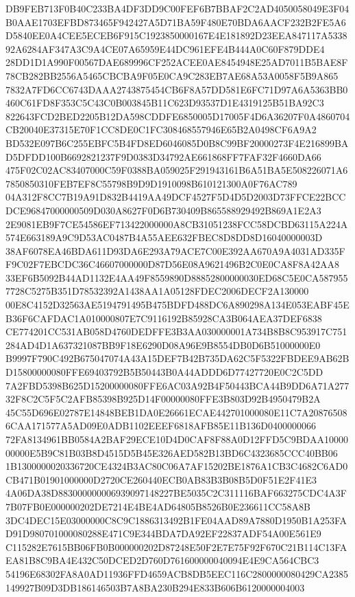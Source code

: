\documentclass[UTF8,fontset=fandol,zihao=-4,a4paper]{ctexart}
\begin{document}
{{DB9FEB713F0B40C233BA4DF3DD9C00FEF6B7BBAF2C2AD4050058049E3F04B0AAE1703EFBD873465F942427A5D71BA59F480E70BDA6AACF232B2FE5A6
D5840EE0A4CEE5ECEB6F915C1923850000167E4E181892D23EEA847117A533892A6284AF347A3C9A4CE07A65959E44DC961EFE4B444A0C60F879DDE4
28DD1D1A990F00567DAE689996CF252ACEE0AE8454948E25AD7011B5BAE8F78CB282BB2556A5465CBCBA9F05E0CA9C283EB7AE68A53A0058F5B9A865
7832A7FD6CC6743DAAA2743875454CB6F8A57DD581E6FC71D97A6A5363BB0460C61FD8F353C5C43C0B003845B11C623D93537D1E4319125B51BA92C3
822643FCD2BED2205B12DA598CDDFE6850005D17005F4D6A36207F0A4860704CB20040E37315E70F1CC8DE0C1FC308468557946E65B2A0498CF6A9A2
BD532E097B6C255EBFC5B4FD8ED6046085D0B8C99BF20000273F4E216899BAD5DFDD100B6692821237F9D0383D34792AE661868FF7FAF32F4660DA66
475F02C02AC83407000C59F0388BA059025F291943161B6A51BA5E508226071A67850850310FEB7EF8C55798B9D9D1910098B610121300A0F76AC789
04A312F8CC7B19A91D832B4419AA49DCF4527F5D4D5D2003D73FFCE22BCCDCE96847000000509D030A8627F0D6B730409B865588929492B869A1E2A3
2E9081EB9F7CE54586EF713422000000A8CB31051238FCC58DCBD63115A224A574E663189A9C9D53AC0487B4A55AEE632FBEC8D8DD8D16040000003D
38AF6078EA46BDA611D93DA6E293A79ACE7C00E392AA670A9A4031AD335FF9C02F7EBCDC36C46607000000D87D56E08A9621496B2C0E0CA8F8A42AA8
33EF6B5092B44AD1132E4AA49F8559890D88852800000030ED68C5E0CA5879557728C5275B351D78532392A1438AA1A05128FDEC2006DECF2A130000
00E8C4152D32563AE5194791495B475BDFD488DC6A890298A134E053EABF45EB36F6CAFDAC1A010000807E7C9116192B85928CA3B064AEA37DEF6838
CE774201CC531AB058D4760DEDFFE3B3AA030000001A734B8B8C953917C751284AD4D1A637321087BB9F18E6290D08A96E9B8554DB0D6B51000000E0
B9997F790C492B675047074A43A15DEF7B42B735DA62C5F5322FBDEE9AB62BD15800000080FFE69403792B5B50443B0A44ADDD6D77427720E0C2C5DD
7A2FBD5398B625D15200000080FFE6AC03A92B4F50443BCA44B9DD6A71A27732F8C2C5F5C2AFB85398B925D14F00000080FFE3B803D92B4950479B2A
45C55D696E02787E14848BEB1DA0E26661ECAE442701000080E11C7A208765086CAA171577A5AD09E0ADB1102EEEF6818AFB85E11B136D0400000066
72FA8134961BB0584A2BAF29ECE10D4D0CAF8F88A0D12FFD5C9BDAA1000000000E5B9C81B03B8D4515D5B45E326AED582B13BD6C4323685CCC40BB06
1B1300000020336720CE4324B3AC80C06A7AF15202BE1876A1CB3C4682C6AD0CB471B01901000000D2720CE260440ECB0AB83B3B08B5D0F51E2F41E3
4A06DA38D883000000006939097148227BE5035C2C311116BAF663275CDC4A3F7B07FB0E000000202DE7214E4BE4AD64805B8526B0E236611CC58A8B
3DC4DEC15E03000000C8C9C1886313492B1FE04AAD89A7880D1950B1A253FAD91D980701000080288E471C9E344BDA7DA92EF22837ADF54A00E561E9
C115282E7615BB06FB0B000000202D87248E50F2E7E75F92F670C21B114C13FAEA81B8C9BA4E432C50DCED2D760D761600000040094E4E9CA564CBC3
54196E68302FA8A0AD11936FFD4659ACB8DB5EEC116C2800000080429CA2385149927B09D3DB186146503B7A8BA230B294E833B606B6120000004003
}}
\end{document}
